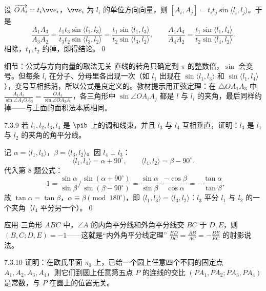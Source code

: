 设 $\overrightarrow{OA_i}=t_i\vv e_i$，$\vv e_i$ 为 $l_i$ 的单位方向向量，则 $[A_i,A_j]=t_it_j\sin\langle l_i,l_j\rangle$。于是
\[
\frac{A_1A_3}{A_3A_2}=\frac{t_1t_3\sin\langle l_1,l_3\rangle}{t_3t_2\sin\langle l_3,l_2\rangle}=\frac{t_1\sin\langle l_1,l_3\rangle}{t_2\sin\langle l_3,l_2\rangle},\qquad
\frac{A_1A_4}{A_4A_2}=\frac{t_1\sin\langle l_1,l_4\rangle}{t_2\sin\langle l_4,l_2\rangle}.
\]
相除，$t_1,t_2$ 约掉，即得结论。\qed

\begin{ckbox}{细节：公式与方向向量的取法无关}
直线的转角只确定到 $\pi$ 的整数倍，$\sin$ 会变号。但每条 $l_i$ 在分子、分母里各出现一次（如 $l_1$ 出现在 $\sin\langle l_1,l_3\rangle$ 和 $\sin\langle l_1,l_4\rangle$），变号互相抵消，所以公式是良定义的。教材提示用正弦定理：在 $\triangle OA_1A_3$ 中 $\frac{A_1A_3}{\sin\angle A_1OA_3}=\frac{OA_1}{\sin\angle OA_3A_1}$，各三角形中 $\sin\angle OA_iA_j$ 都是 $l$ 与 $l_i$ 的夹角，最后同样约掉——与上面的面积法本质相同。
\end{ckbox}

\begin{ex}{7.3.9}
若 $l_1,l_2,l_3,l_4$ 是 $\pib$ 上的调和线束，并且 $l_3$ 与 $l_4$ 互相垂直，证明：$l_3$ 是 $l_1$ 与 $l_2$ 的夹角的角平分线。
\end{ex}
\zheng 记 $\alpha=\langle l_1,l_3\rangle$，$\beta=\langle l_3,l_2\rangle$。因 $l_4\perp l_3$：
\[
\langle l_1,l_4\rangle=\alpha+90^\circ,\qquad \langle l_4,l_2\rangle=\beta-90^\circ .
\]
代入第 8 题公式：
\[
-1=\frac{\sin\alpha}{\sin\beta}\Big/\frac{\sin(\alpha+90^\circ)}{\sin(\beta-90^\circ)}=\frac{\sin\alpha}{\sin\beta}\cdot\frac{-\cos\beta}{\cos\alpha}=-\frac{\tan\alpha}{\tan\beta},
\]
故 $\tan\alpha=\tan\beta$，$\alpha\equiv\beta\pmod{180^\circ}$，即 $\langle l_1,l_3\rangle=\langle l_3,l_2\rangle$：$l_3$ 平分 $l_1$ 与 $l_2$ 的一个夹角（$l_4$ 平分另一个）。\qed

\begin{intbox}{应用}
三角形 $ABC$ 中，$\angle A$ 的内角平分线和外角平分线交 $BC$ 于 $D,E$，则 $(B,C;D,E)=-1$——这就是“内外角平分线定理” $\frac{BD}{DC}=\frac{AB}{AC}=-\frac{BE}{EC}$ 的射影说法。
\end{intbox}

\begin{ex}{7.3.10}
证明：在欧氏平面 $\pi_0$ 上，已给一个圆上任意四个不同的固定点 $A_1,A_2,A_3,A_4$，则它们到圆上任意第五点 $P$ 的连线的交比 $(PA_1,PA_2;PA_3,PA_4)$ 是常数，与 $P$ 在圆上的位置无关。
\end{ex}

